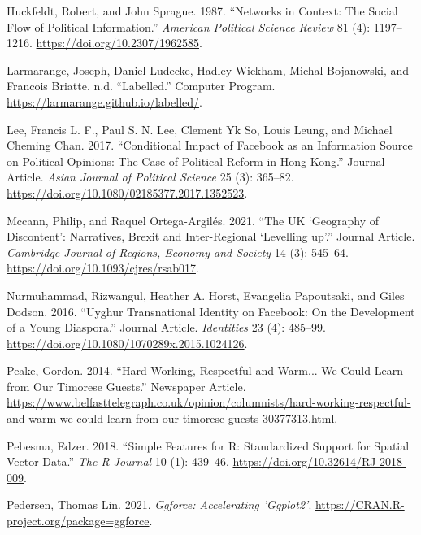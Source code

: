 \documentclass{article}
\newlength{\cslhangindent}
\newlength{\cslentryspacingunit} %
\newenvironment{CSLReferences}[2] %
 {%
  \setlength{\parindent}{0pt}
  \ifodd #1
  \let\oldpar\par
  \def\par{\hangindent=\cslhangindent\oldpar}
  \fi
  \setlength{\parskip}{#2\cslentryspacingunit}
 }%
 {}
\begin{document}
\begin{CSLReferences}{1}{0}
\leavevmode{}%
Huckfeldt, Robert, and John Sprague. 1987. {``Networks in Context: The
Social Flow of Political Information.''} \emph{American Political
Science Review} 81 (4): 1197--1216.
\url{https://doi.org/10.2307/1962585}.

\leavevmode{}%
Larmarange, Joseph, Daniel Ludecke, Hadley Wickham, Michal Bojanowski,
and Francois Briatte. n.d. {``Labelled.''} Computer Program.
\url{https://larmarange.github.io/labelled/}.

\leavevmode{}%
Lee, Francis L. F., Paul S. N. Lee, Clement Yk So, Louis Leung, and
Michael Cheming Chan. 2017. {``Conditional Impact of Facebook as an
Information Source on Political Opinions: The Case of Political Reform
in Hong Kong.''} Journal Article. \emph{Asian Journal of Political
Science} 25 (3): 365--82.
\url{https://doi.org/10.1080/02185377.2017.1352523}.

\leavevmode{}%
Mccann, Philip, and Raquel Ortega-Argilés. 2021. {``The UK {`Geography
of Discontent'}: Narratives, Brexit and Inter-Regional {`Levelling
up'}.''} Journal Article. \emph{Cambridge Journal of Regions, Economy
and Society} 14 (3): 545--64.
\url{https://doi.org/10.1093/cjres/rsab017}.

\leavevmode{}%
Nurmuhammad, Rizwangul, Heather A. Horst, Evangelia Papoutsaki, and
Giles Dodson. 2016. {``Uyghur Transnational Identity on Facebook: On the
Development of a Young Diaspora.''} Journal Article. \emph{Identities}
23 (4): 485--99. \url{https://doi.org/10.1080/1070289x.2015.1024126}.

\leavevmode{}%
Peake, Gordon. 2014. {``Hard-Working, Respectful and Warm... We Could
Learn from Our Timorese Guests.''} Newspaper Article.
\url{https://www.belfasttelegraph.co.uk/opinion/columnists/hard-working-respectful-and-warm-we-could-learn-from-our-timorese-guests-30377313.html}.

\leavevmode{}%
Pebesma, Edzer. 2018. {``{Simple Features for R: Standardized Support
for Spatial Vector Data}.''} \emph{{The R Journal}} 10 (1): 439--46.
\url{https://doi.org/10.32614/RJ-2018-009}.

\leavevmode{}%
Pedersen, Thomas Lin. 2021. \emph{Ggforce: Accelerating 'Ggplot2'}.
\url{https://CRAN.R-project.org/package=ggforce}.


\end{CSLReferences}
\end{document}
